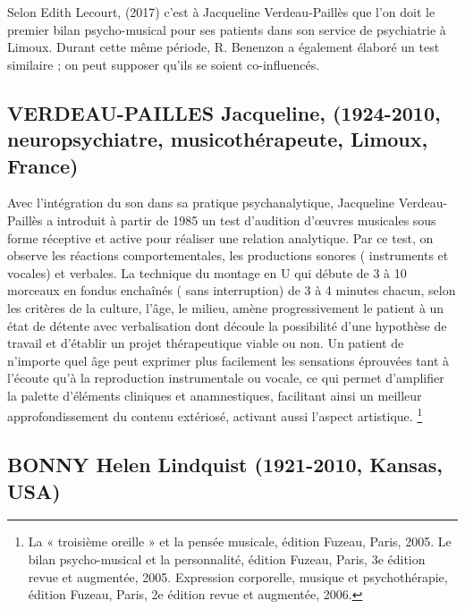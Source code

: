         Selon Edith Lecourt,
(2017)\autocite[ch.~3, p.~84]{Les arts-thérapies,Ed.Armand-Colin}
c'est à Jacqueline Verdeau-Paillès que l'on doit le premier bilan psycho-musical pour ses patients dans son service
de psychiatrie à Limoux. Durant cette même période, R.
Benenzon a également élaboré un test similaire \autocite{benenzon:musicotherapie}; on peut supposer qu'ils se soient co-influencés. 


	


\subsection{VERDEAU-PAILLES Jacqueline, (1924-2010, neuropsychiatre,
  musicothérapeute, Limoux, France)}
Avec l'intégration du son dans sa pratique psychanalytique, 
Jacqueline Verdeau-Paillès a introduit  à partir de 1985  un test d'audition d'\oe uvres musicales
sous forme réceptive et active pour réaliser
une relation analytique\autocite{verdeau-pailles:bilan}.
Par ce test, on
observe les réactions comportementales, les productions sonores (
instruments et vocales) et verbales. La technique du montage en U qui débute de 3 à 10
morceaux en fondus enchaînés ( sans interruption) de 3 à 4 minutes chacun, selon les
critères de la culture, l'âge, le milieu,
amène progressivement le patient à un état de détente
avec verbalisation dont découle la possibilité 
d'une hypothèse de
travail et d'établir un projet thérapeutique viable ou non.
Un patient de n'importe quel âge peut exprimer plus facilement les
sensations éprouvées tant à l'écoute qu'à la reproduction
instrumentale ou vocale, ce qui permet d'amplifier la palette d'éléments
cliniques et anamnestiques, facilitant ainsi un meilleur approfondissement du
contenu extériosé, activant aussi l'aspect artistique.
\footnote{ La « troisième oreille » et la pensée musicale, édition Fuzeau, Paris, 2005.
Le bilan psycho-musical et la personnalité, édition Fuzeau, Paris, 3e édition revue et augmentée, 2005.
Expression corporelle, musique et psychothérapie, édition Fuzeau,
Paris, 2e édition revue et augmentée, 2006.} 



\subsection{BONNY  Helen Lindquist (1921-2010, Kansas, USA)} 


